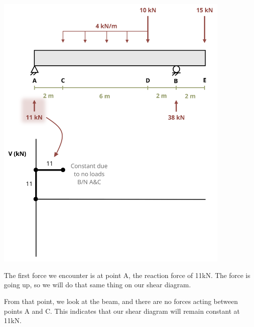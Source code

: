 \documentclass[
  letterpaper,
  DIV=11,
  numbers=noendperiod]{scrreprt}
\begin{document}
\begin{tcolorbox}
\begin{center}
\includegraphics[width=4.54167in,height=\textheight]{images/CH7 PNGs/example 7.3 part 3.png}
\end{center}

The first force we encounter is at point A, the reaction force of 11kN.
The force is going up, so we will do that same thing on our shear
diagram.

From that point, we look at the beam, and there are no forces acting
between points A and C. This indicates that our shear diagram will
remain constant at 11kN.


\end{tcolorbox}
\end{document}
